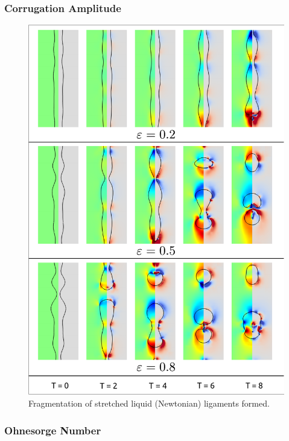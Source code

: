 \subsubsection*{Corrugation Amplitude}

\begin{figure}
\centering
\includegraphics{plots/ligament_breakup/amplitude_compare.pdf}
\caption{Fragmentation of stretched liquid (Newtonian) ligaments formed. 
	}
\label{amp_comp}
\end{figure}

\subsubsection*{Ohnesorge Number}

